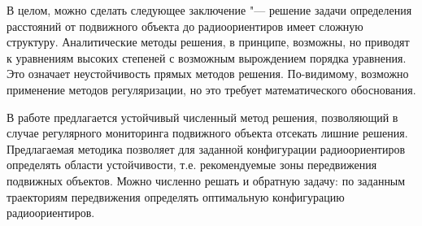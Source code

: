 \documentclass[a4paper,12pt]{article}
\begin{document}
В целом, можно сделать следующее заключение "--- решение задачи определения расстояний от подвижного объекта до радиоориентиров
имеет сложную структуру. Аналитические методы решения, в принципе, возможны, но приводят к уравнениям высоких степеней с возможным
вырождением порядка уравнения. Это означает неустойчивость прямых методов решения. По-видимому, возможно применение методов регуляризации,
но это требует математического обоснования.

В работе предлагается устойчивый численный метод решения, позволяющий в случае регулярного мониторинга подвижного объекта отсекать лишние решения.
Предлагаемая методика позволяет для заданной конфигурации радиоориентиров определять области устойчивости, т.е. рекомендуемые зоны передвижения
подвижных объектов. Можно численно решать и обратную задачу: по заданным траекториям передвижения определять оптимальную конфигурацию радиоориентиров.
\end{document}
